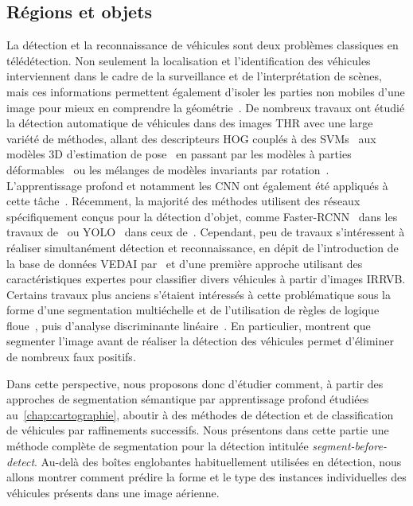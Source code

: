 \subsection{Régions et objets}

La détection et la reconnaissance de véhicules sont deux problèmes classiques en télédétection. Non seulement la localisation et l'identification des véhicules interviennent dans le cadre de la surveillance et de l'interprétation de scènes, mais ces informations permettent également d'isoler les parties non mobiles d'une image pour mieux en comprendre la géométrie~\cite{leberl_recognizing_2007}. De nombreux travaux ont étudié la détection automatique de véhicules dans des images \gls{THR} avec une large variété de méthodes, allant des descripteurs \gls{HOG} couplés à des \glspl{SVM}~\cite{michel_local_2011,gleason_vehicle_2011,kamenetsky_aerial_2015} aux modèles 3D d'estimation de pose~\cite{janney_pose-invariant_2015} en passant par les modèles à parties déformables~\cite{randrianarivo_urban_2013} ou les mélanges de modèles invariants par rotation~\cite{randrianarivo_contextual_2016}. L'apprentissage profond et notamment les \gls{CNN} ont également été appliqués à cette tâche~\cite{chen_vehicle_2014}. Récemment, la majorité des méthodes utilisent des réseaux spécifiquement conçus pour la détection d'objet, comme Faster-RCNN~\cite{ren_faster_2017} dans les travaux de~\citet{sommer_fast_2017} ou YOLO~\cite{redmon_you_2016} dans ceux de~\citet{van_etten_you_2018}. Cependant, peu de travaux s'intéressent à réaliser simultanément détection et reconnaissance, en dépit de l'introduction de la base de données \gls{VEDAI} par~\citet{razakarivony_vehicle_2016} et d'une première approche utilisant des caractéristiques expertes pour classifier divers véhicules à partir d'images \gls{IRRVB}. Certains travaux plus anciens s'étaient intéressés à cette problématique sous la forme d'une segmentation multiéchelle et de l'utilisation de règles de logique floue~\cite{holt_object-based_2009}, puis d'analyse discriminante linéaire~\cite{eikvil_classification-based_2009}. En particulier, \citet{eikvil_classification-based_2009} montrent que segmenter l'image avant de réaliser la détection des véhicules permet d'éliminer de nombreux faux positifs.

Dans cette perspective, nous proposons donc d'étudier comment, à partir des approches de segmentation sémantique par apprentissage profond étudiées au~\cref{chap:cartographie}, aboutir à des méthodes de détection et de classification de véhicules par raffinements successifs. Nous présentons dans cette partie une méthode complète de segmentation pour la détection intitulée \emph{segment-before-detect}. Au-delà des boîtes englobantes habituellement utilisées en détection, nous allons montrer comment prédire la forme et le type des instances individuelles des véhicules présents dans une image aérienne.

